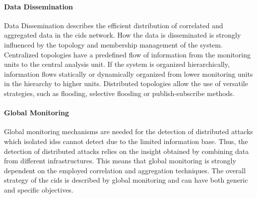 \paragraph{Data Dissemination}\label{par:data dissemniation} Data Dissemination describes the efficient distribution of correlated and aggregated data in the \gls{cids} network. How the data is disseminated is strongly influenced by the topology and membership management of the system. Centralized topologies have a predefined flow of information from the monitoring units to the central analysis unit. If the system is organized hierarchically, information flows statically or dynamically organized from lower monitoring units in the hierarchy to higher units. Distributed topologies allow the use of versatile strategies, such as flooding, selective flooding or publish-subscribe methods.

\paragraph{Global Monitoring}\label{par:global_monitoring} Global monitoring mechanisms are needed for the detection of distributed attacks which isolated \gls{ids}s cannot detect due to the limited information base. Thus, the detection of distributed attacks relies on the insight obtained by combining data from different infrastructures. This means that global monitoring is strongly dependent on the employed correlation and aggregation techniques. The overall strategy of the \gls{cids} is described by global monitoring and can have both generic and specific objectives. 




